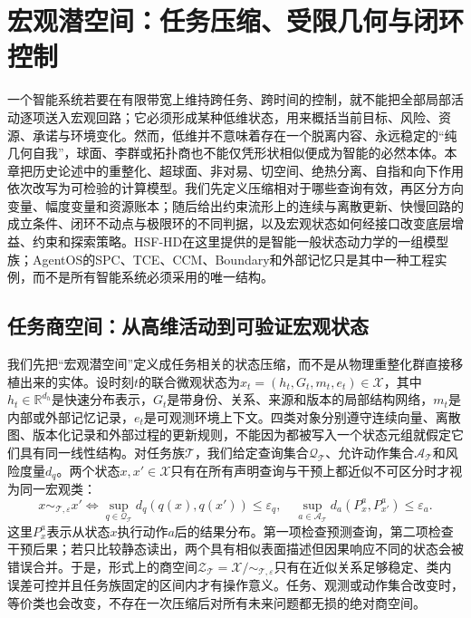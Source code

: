\chapter{宏观潜空间：任务压缩、受限几何与闭环控制}
\label{chp:macro_latent_space_topology}

一个智能系统若要在有限带宽上维持跨任务、跨时间的控制，就不能把全部局部活动逐项送入宏观回路；它必须形成某种低维状态，用来概括当前目标、风险、资源、承诺与环境变化。然而，低维并不意味着存在一个脱离内容、永远稳定的“纯几何自我”，球面、李群或拓扑商也不能仅凭形状相似便成为智能的必然本体。本章把历史论述中的重整化、超球面、非对易、切空间、绝热分离、自指和向下作用依次改写为可检验的计算模型。我们先定义压缩相对于哪些查询有效，再区分方向变量、幅度变量和资源账本；随后给出约束流形上的连续与离散更新、快慢回路的成立条件、闭环不动点与极限环的不同判据，以及宏观状态如何经接口改变底层增益、约束和探索策略。HSF-HD在这里提供的是智能一般状态动力学的一组模型族；AgentOS的SPC、TCE、CCM、Boundary和外部记忆只是其中一种工程实例，而不是所有智能系统必须采用的唯一结构。

\section{任务商空间：从高维活动到可验证宏观状态}
\label{sec:meta_topology_rg_flow}

我们先把“宏观潜空间”定义成任务相关的状态压缩，而不是从物理重整化群直接移植出来的实体。设时刻$t$的联合微观状态为$x_t=(h_t,G_t,m_t,e_t)\in\mathcal X$，其中$h_t\in\mathbb R^{d_h}$是快速分布表示，$G_t$是带身份、关系、来源和版本的局部结构网络，$m_t$是内部或外部记忆记录，$e_t$是可观测环境上下文。四类对象分别遵守连续向量、离散图、版本化记录和外部过程的更新规则，不能因为都被写入一个状态元组就假定它们具有同一线性结构。对任务族$\mathcal T$，我们给定查询集合$\mathcal Q_{\mathcal T}$、允许动作集合$\mathcal A_{\mathcal T}$和风险度量$d_q$。两个状态$x,x'\in\mathcal X$只有在所有声明查询与干预上都近似不可区分时才视为同一宏观类：
\begin{equation}
 x\sim_{\mathcal T,\varepsilon}x'
 \Longleftrightarrow
 \sup_{q\in\mathcal Q_{\mathcal T}}d_q\!\left(q(x),q(x')\right)\leq\varepsilon_q,
 \quad
 \sup_{a\in\mathcal A_{\mathcal T}}d_a\!\left(P_x^a,P_{x'}^a\right)\leq\varepsilon_a .
\end{equation}
这里$P_x^a$表示从状态$x$执行动作$a$后的结果分布。第一项检查预测查询，第二项检查干预后果；若只比较静态读出，两个具有相似表面描述但因果响应不同的状态会被错误合并。于是，形式上的商空间$\mathcal Z_{\mathcal T}=\mathcal X/\!\sim_{\mathcal T,\varepsilon}$只有在近似关系足够稳定、类内误差可控并且任务族固定的区间内才有操作意义。任务、观测或动作集合改变时，等价类也会改变，不存在一次压缩后对所有未来问题都无损的绝对商空间。

